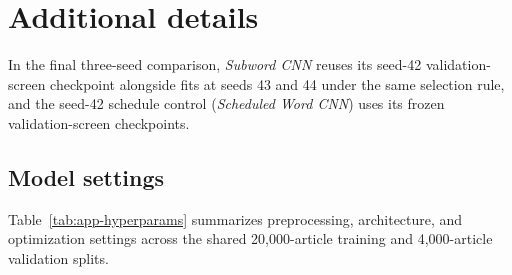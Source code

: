 \chapter{Additional details}\label{app:decisions}\label{app:fullresults}

In the final three-seed comparison, \textit{Subword CNN} reuses its seed-42 validation-screen checkpoint alongside fits at seeds 43 and 44 under the same selection rule, and the seed-42 schedule control (\textit{Scheduled Word CNN}) uses its frozen validation-screen checkpoints.

\section{Model settings}
Table~\ref{tab:app-hyperparams} summarizes preprocessing, architecture, and optimization settings across the shared 20,000-article training and 4,000-article validation splits.

